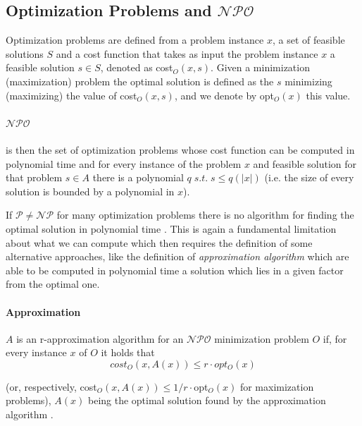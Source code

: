 \subsection{Optimization Problems and $\mathcal{NPO} $}%
\label{sub:optimization_problems}

Optimization problems are defined from a problem instance $x$, a set of
feasible solutions $S$ and a cost function that takes as input the problem
instance $x$ a feasible solution $s \in S$, denoted as cost$_{O} (x, s) $.
Given a minimization (maximization) problem the optimal solution is defined as
the $s$ minimizing (maximizing) the value of cost$_{O} (x, s)$, and we denote
by opt$_{O} (x) $ this value\cite{Trevisan2004}.

\paragraph{$\mathcal{NPO} $}%
\label{par:_npo_}

is then the set of optimization problems whose cost function
can be computed in polynomial time and for every instance of the problem $x$
and feasible solution for that problem $s \in A$ there is a polynomial $q \; s.t.
	\; s \leq q(|x|)$ (i.e. the size of every solution is bounded by a polynomial
in $x$).

If $\mathcal{P} \neq \mathcal{NP} $ for many optimization problems there is no
algorithm for finding the optimal solution in polynomial time
\cite{Trevisan2004}. This is again a fundamental limitation about what we can
compute which then requires the definition of some alternative approaches, like
the definition of \emph{approximation algorithm}
which are able to be computed in polynomial time
a solution which lies in a given factor from the optimal
one\cite{Vazirani2002}.

\paragraph{Approximation}%
\label{par:r_approximations}

$A$ is an r-approximation algorithm for an $\mathcal{NPO} $ minimization
problem $O$ if, for every instance $x$ of $O$ it holds that
\begin{equation*}
	cost_{O} (x, A(x)) \leq r \cdot opt_{O} (x)
\end{equation*}

\noindent
(or, respectively, cost$_{O} (x, A(x))
	\leq 1/r \cdot $opt$_{O} (x) $ for maximization problems), $A(x)$ being the
optimal solution found by the approximation algorithm \cite{Trevisan2004}.

